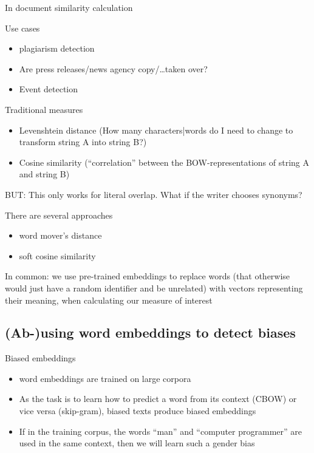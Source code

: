 \begin{frame}{In document similarity calculation}
  \begin{block}{Use cases}
    \begin{itemize}
    \item plagiarism detection
    \item Are press releases/news agency copy/\ldots taken over?
    \item Event detection
    \end{itemize}
  \end{block}
  \pause
  \begin{block}{Traditional measures}
    \begin{itemize}
    \item Levenshtein distance (How many characters|words do I need to change to transform string A into string B?)
    \item Cosine similarity (``correlation'' between the BOW-representations of string A and string B)
    \end{itemize}
  \end{block}
\end{frame}


\begin{frame}[plain]
	BUT: This only works for literal overlap. What if the writer chooses synonyms?

	
	
	
\cite{Kusner2015}
\end{frame}


\begin{frame}{There are several approaches}
  \begin{itemize}
  \item word mover's distance
  \item soft cosine similarity
  \end{itemize}
  In common: we use pre-trained embeddings to replace words (that otherwise would just have a random identifier and be unrelated) with vectors representing their meaning, when calculating our measure of interest
\end{frame}


\subsection[Detecting biases]{(Ab-)using word embeddings to detect biases}


\begin{frame}{Biased embeddings \cite{Bolukbasi2016}}
  \begin{itemize}
  \item word embeddings are trained on large corpora
  \item As the task is to learn how to predict a word from its context (CBOW) or vice versa (skip-gram), biased texts produce biased embeddings
  \item If in the training corpus, the words ``man'' and ``computer programmer'' are used in the same context, then we will learn such a gender bias
  \end{itemize}
  
\end{frame}


